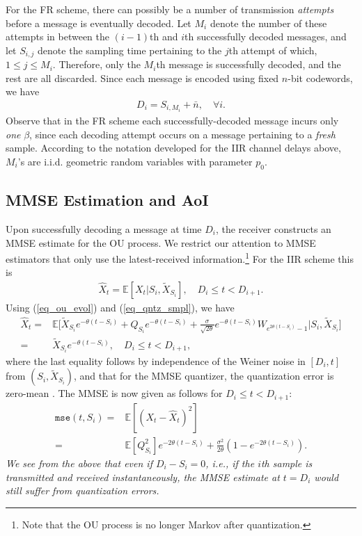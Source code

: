 \documentclass[12pt,journal,onecolumn]{IEEEtran}
\begin{document}
For the FR scheme, there can possibly be a number of transmission {\it attempts} before a message is eventually decoded. Let $M_i$ denote the number of these attempts in between the $(i-1)$th and $i$th successfully decoded messages, and let $S_{i,j}$ denote the sampling time pertaining to the $j$th attempt of which, $1\leq j\leq M_i$. Therefore, only the $M_i$th message is successfully decoded, and the rest are all discarded. Since each message is encoded using fixed $n$-bit codewords, we have
\begin{align}
D_i=S_{i,M_i}+\bar{n}, \quad\forall i.
\end{align}
Observe that in the FR scheme each successfully-decoded message incurs only {\it one} $\beta$, since each decoding attempt occurs on a message pertaining to a {\it fresh} sample. According to the notation developed for the IIR channel delays above, $M_i$'s are i.i.d. geometric random variables with parameter $p_0$.


\subsection{MMSE Estimation and AoI}

Upon successfully decoding a message at time $D_i$, the receiver constructs an MMSE estimate for the OU process. We restrict our attention to MMSE estimators that only use the latest-received information.\footnote{Note that the OU process is no longer Markov after quantization.} For the IIR scheme this is
\begin{align}
\hat{X}_t=\mathbb{E}\left[X_t\Big|S_i,\tilde{X}_{S_i}\right],\quad D_i\leq t<D_{i+1}.
\end{align}
Using (\ref{eq_ou_evol}) and (\ref{eq_qntz_smpl}), we have
\begin{align}
\hat{X}_t=&\mathbb{E}\bigg[\tilde{X}_{S_i}e^{-\theta
\left(t-S_i\right)}+Q_{S_i}e^{-\theta\left(t-S_i\right)}+\frac{\sigma}{\sqrt{2\theta}}e^{-\theta\left(t-S_i\right)}W_{e^{2\theta\left(t-S_i\right)}-1}\bigg|S_i,\tilde{X}_{S_i}\bigg] \\
=&\tilde{X}_{S_i}e^{-\theta\left(t-S_i\right)},\quad D_i\leq t<D_{i+1},
\end{align}
where the last equality follows by independence of the Weiner noise in $[D_i,t]$ from $(S_i,\tilde{X}_{S_i})$, and that for the MMSE quantizer, the quantization error is zero-mean \cite{cover}. The MMSE is now given as follows for $D_i\leq t<D_{i+1}$: 
\begin{align}
\texttt{mse}\left(t,S_i\right)=&\mathbb{E}\left[\left(X_t-\hat{X}_t\right)^2\right] \\
=&\mathbb{E}\left[Q_{S_i}^2\right]e^{-2\theta\left(t-S_i\right)}+\frac{\sigma^2}{2\theta}\left(1-e^{-2\theta\left(t-S_i\right)}\right). \label{eq_mse_qnt_dly}
\end{align}
{\it We see from the above that even if $D_i-S_i=0$, i.e., if the $i$th sample is transmitted and received instantaneously, the MMSE estimate at $t=D_i$ would still suffer from quantization errors.} 
\end{document}
